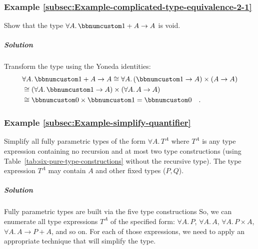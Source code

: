 \subsubsection{Example \label{subsec:Example-complicated-type-equivalence-2-1}\ref{subsec:Example-complicated-type-equivalence-2-1}}

Show that the type $\forall A.\,\bbnum 1+A\rightarrow A$ is void.

\subparagraph{Solution}

Transform the type using the Yoneda identities:
\begin{align*}
 & \forall A.\,\bbnum 1+A\rightarrow A\cong\forall A.\,(\bbnum 1\rightarrow A)\times(A\rightarrow A)\\
 & \cong(\forall A.\,\bbnum 1\rightarrow A)\times(\forall A.\,A\rightarrow A)\\
 & \cong\bbnum 0\times\bbnum 1=\bbnum 0\quad.
\end{align*}


\subsubsection{Example \label{subsec:Example-simplify-quantifier}\ref{subsec:Example-simplify-quantifier}}

Simplify all fully parametric types of the form $\forall A.\,T^{A}$
where $T^{A}$ is any type expression containing no recursion and
at most two type constructions (using Table~\ref{tab:six-pure-type-constructions}
without the recursive type). The type expression $T^{A}$ may contain
$A$ and other fixed types ($P,$$Q$).

\subparagraph{Solution}

Fully parametric types are built via the five type constructions So,
we can enumerate all type expressions $T^{A}$ of the specified form:
$\forall A.\,P$, $\forall A.\,A$, $\forall A.\,P\times A$, $\forall A.\,A\rightarrow P+A$,
and so on. For each of those expressions, we need to apply an appropriate
technique that will simplify the type.

